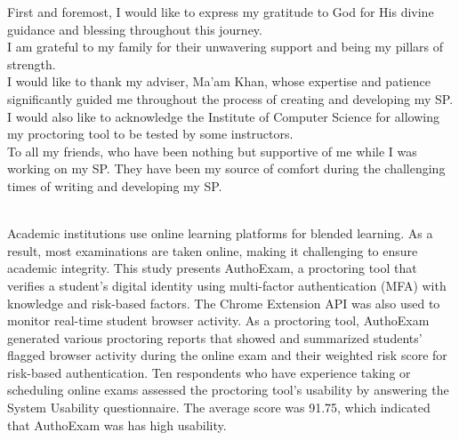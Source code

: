 \documentclass{icsthesis}
\begin{document}
\begin{frontmatter}
		\begin{acknowledgement}
			\indent First and foremost, I would like to express my gratitude to God for His divine guidance and blessing throughout this journey.\\
                \indent I am grateful to my family for their unwavering support and being my pillars of strength.\\
                \indent I would like to thank my adviser, Ma'am Khan, whose expertise and patience significantly guided me throughout the process of creating and developing my SP. I would also like to acknowledge the Institute of Computer Science for allowing my proctoring tool to be tested by some instructors.\\
                \indent To all my friends, who have been nothing but supportive of me while I was working on my SP. They have been my source of comfort during the challenging times of writing and developing my SP.
		\end{acknowledgement}

            
		\maketableofcontents
  
		
	

		
		\begin{abstractwithpageno}	
		\\
	       Academic institutions use online learning platforms for blended learning. As a result, most examinations are taken online, making it challenging to ensure academic integrity. This study presents AuthoExam, a proctoring tool that verifies a student's digital identity using multi-factor authentication (MFA) with knowledge and risk-based factors. The Chrome Extension API was also used to monitor real-time student browser activity. As a proctoring tool, AuthoExam generated various proctoring reports that showed and summarized students' flagged browser activity during the online exam and their weighted risk score for risk-based authentication. Ten respondents who have experience taking or scheduling online exams assessed the proctoring tool's usability by answering the System Usability questionnaire. The average score was 91.75, which indicated that AuthoExam was has high usability. 

		\end{abstractwithpageno}

\end{frontmatter}
	
\end{document}
